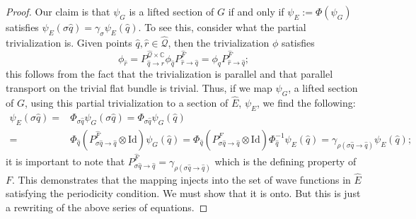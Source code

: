 \documentclass[11pt]{article}
\theoremstyle{remark}
\begin{document}
\begin{proof}
Our claim is
that $\ensuremath{\psi}_G$ is a lifted section of $G$ if and only if $\ensuremath{\psi}_E \ensuremath{:=}
\Phi(\ensuremath{\psi}_G)$ satisfies $\ensuremath{\psi}_E (\ensuremath{\sigma} \ensuremath{\hat{q}}) = \ensuremath{\gamma}_{\ensuremath{\sigma}}\ensuremath{\psi}_E
(\ensuremath{\hat{q}}) $. 
To see this, consider what the partial trivialization
  is. Given points $\ensuremath{\hat{q}}, \ensuremath{\widehat{r}} \in \ensuremath{\widehat{\ensuremath{\mathcal{Q}}}}$, then the
  trivialization $\phi$ satisfies 
\[\phi_{\ensuremath{\widehat{r}}} = P_{\ensuremath{\hat{q}} \to \ensuremath{\widehat{r}} }^{\ensuremath{\widehat{\ensuremath{\mathcal{Q}}}} \times \ensuremath{\mathbb{C}}} \phi_{\ensuremath{\hat{q}}}
  P_{\ensuremath{\widehat{r}} \to \ensuremath{\hat{q}}}^{\ensuremath{\widehat{F}}} = \phi_{\ensuremath{\hat{q}}}
  P_{\ensuremath{\widehat{r}} \to \ensuremath{\hat{q}}}^{\ensuremath{\widehat{F}}};\] 
 this follows from the fact that the trivialization is parallel
    and that parallel transport on the trivial flat bundle is
    trivial. Thus, if we  map  $\ensuremath{\psi}_G$, a lifted section of $G$, using this
    partial trivialization to a section of $\ensuremath{\widehat{E}}$, $\ensuremath{\psi}_E$, we find the
    following:
\begin{equation*}
\begin{split}
 \ensuremath{\psi}_E (\ensuremath{\sigma} \ensuremath{\hat{q}}) = & \Phi_{\ensuremath{\sigma} \ensuremath{\hat{q}}} \ensuremath{\psi}_G (\ensuremath{\sigma} \ensuremath{\hat{q}}) =
\Phi_{\ensuremath{\sigma} \ensuremath{\hat{q}}} \ensuremath{\psi}_G ( \ensuremath{\hat{q}})  \\
= & \Phi_{\ensuremath{\hat{q}}} (P_{\ensuremath{\sigma} \ensuremath{\hat{q}} \to
  \ensuremath{\hat{q}}}^{\ensuremath{\widehat{F}}}\otimes \text{Id})
 \ensuremath{\psi}_G(\ensuremath{\hat{q}}) = \Phi_{\ensuremath{\hat{q}}} (P_{\ensuremath{\sigma} \ensuremath{\hat{q}} \to
  \ensuremath{\hat{q}}}^{\ensuremath{\widehat{F}}} \otimes \text{Id}) \Phi_{\ensuremath{\hat{q}}}^{-1} 
\ensuremath{\psi}_E(\ensuremath{\hat{q}}) = \gamma_{\ensuremath{\ensuremath{\rho}}(\ensuremath{\sigma} \ensuremath{\hat{q}} \to  \ensuremath{\hat{q}})} \ensuremath{\psi}_E(\ensuremath{\hat{q}});
\end{split}
\end{equation*}
it is important to note that $P_{\ensuremath{\sigma} \ensuremath{\hat{q}} \to
  \ensuremath{\hat{q}}}^{\ensuremath{\widehat{F}}} = \gamma_{\ensuremath{\ensuremath{\rho}}(\ensuremath{\sigma} \ensuremath{\hat{q}} \to  \ensuremath{\hat{q}})}$ which is
  the defining property of $F$. This demonstrates that the mapping
  injects into the set of wave functions in $\ensuremath{\widehat{E}}$ 
satisfying the periodicity condition. We must show that it is
  onto. But this is just a rewriting of the above series of
  equations.


\end{proof}
\end{document}
